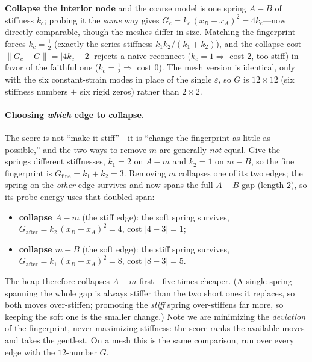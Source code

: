 \textbf{Collapse the interior node} and the coarse model is one spring $A\!-\!B$ of stiffness $k_c$; probing it the \emph{same} way gives $G_c=k_c\,(x_B-x_A)^2=4k_c$---now directly comparable, though the meshes differ in size.
Matching the fingerprint forces $k_c=\tfrac12$ (exactly the series stiffness $k_1k_2/(k_1{+}k_2)$), and the collapse cost $\|G_c-G\|=|4k_c-2|$ rejects a naive reconnect ($k_c{=}1\Rightarrow$ cost $2$, too stiff) in favor of the faithful one ($k_c{=}\tfrac12\Rightarrow$ cost $0$).
The mesh version is identical, only with the six constant-strain modes in place of the single $\varepsilon$, so $G$ is $12\times12$ (six stiffness numbers $+$ six rigid zeros) rather than $2\times2$.

\paragraph{Choosing \emph{which} edge to collapse.}
The score is not ``make it stiff''---it is ``change the fingerprint as little as possible,'' and the two ways to remove $m$ are generally \emph{not} equal.
Give the springs different stiffnesses, $k_1=2$ on $A\!-\!m$ and $k_2=1$ on $m\!-\!B$, so the fine fingerprint is $G_{\text{fine}}=k_1+k_2=3$.
Removing $m$ collapses one of its two edges; the spring on the \emph{other} edge survives and now spans the full $A\!-\!B$ gap (length $2$), so its probe energy uses that doubled span:
\begin{itemize}
  \item \textbf{collapse $A\!-\!m$} (the stiff edge): the soft spring survives, $G_{\text{after}}=k_2\,(x_B-x_A)^2=4$, cost $|4-3|=1$;
  \item \textbf{collapse $m\!-\!B$} (the soft edge): the stiff spring survives, $G_{\text{after}}=k_1\,(x_B-x_A)^2=8$, cost $|8-3|=5$.
\end{itemize}
The heap therefore collapses $A\!-\!m$ first---five times cheaper.
(A single spring spanning the whole gap is always stiffer than the two short ones it replaces, so both moves over-stiffen; promoting the \emph{stiff} spring over-stiffens far more, so keeping the soft one is the smaller change.)
Note we are minimizing the \emph{deviation} of the fingerprint, never maximizing stiffness: the score ranks the available moves and takes the gentlest.
On a mesh this is the same comparison, run over every edge with the $12$-number $G$.

